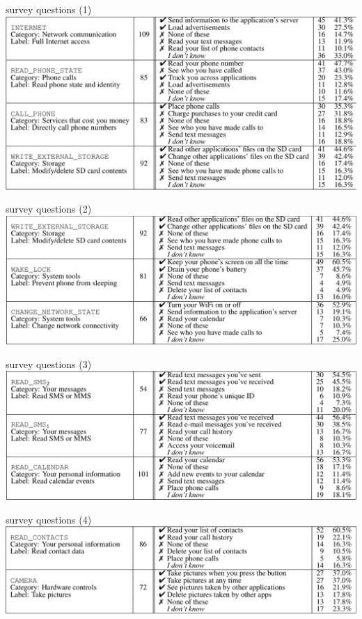 \begin{frame}{survey questions (1)}
\includegraphics[width=\textwidth]{../sandbox/android-perm-survey1}
\end{frame}

\begin{frame}{survey questions (2)}
\includegraphics[width=\textwidth]{../sandbox/android-perm-survey2}
\end{frame}

\begin{frame}{survey questions (3)}
\includegraphics[width=\textwidth]{../sandbox/android-perm-survey3}
\end{frame}

\begin{frame}{survey questions (4)}
\includegraphics[width=\textwidth]{../sandbox/android-perm-survey4}
\end{frame}
